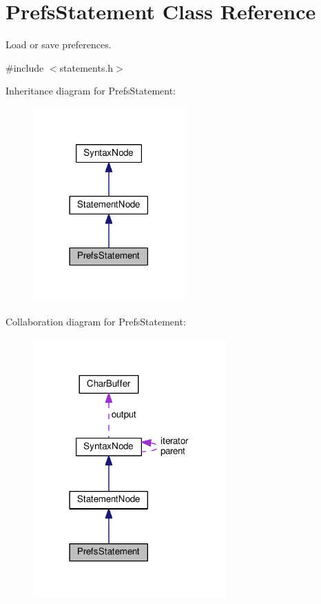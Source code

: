 \hypertarget{classPrefsStatement}{}\section{Prefs\+Statement Class Reference}
\label{classPrefsStatement}


Load or save preferences.  




{\ttfamily \#include $<$statements.\+h$>$}



Inheritance diagram for Prefs\+Statement\+:\nopagebreak
\begin{figure}[H]
\begin{center}
\leavevmode
\includegraphics[width=165pt]{classPrefsStatement__inherit__graph}
\end{center}
\end{figure}


Collaboration diagram for Prefs\+Statement\+:\nopagebreak
\begin{figure}[H]
\begin{center}
\leavevmode
\includegraphics[width=210pt]{classPrefsStatement__coll__graph}
\end{center}
\end{figure}
